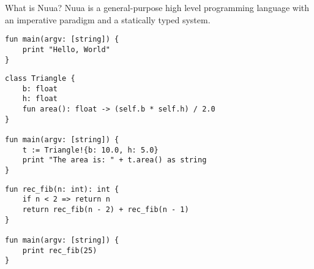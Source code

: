 \begin{slide}
    \begin{block}{What is Nuua?}
        Nuua is a general-purpose high level programming language with an imperative paradigm and a statically typed system.
    \end{block}
    \vfill
    \begin{verbatim}
fun main(argv: [string]) {
    print "Hello, World"
}
    \end{verbatim}
\end{slide}
\begin{slide}
    \begin{verbatim}
class Triangle {
    b: float
    h: float
    fun area(): float -> (self.b * self.h) / 2.0
}

fun main(argv: [string]) {
    t := Triangle!{b: 10.0, h: 5.0}
    print "The area is: " + t.area() as string
}
    \end{verbatim}
\end{slide}
\begin{slide}
    \begin{verbatim}
fun rec_fib(n: int): int {
    if n < 2 => return n
    return rec_fib(n - 2) + rec_fib(n - 1)
}

fun main(argv: [string]) {
    print rec_fib(25)
}
    \end{verbatim}
\end{slide}
